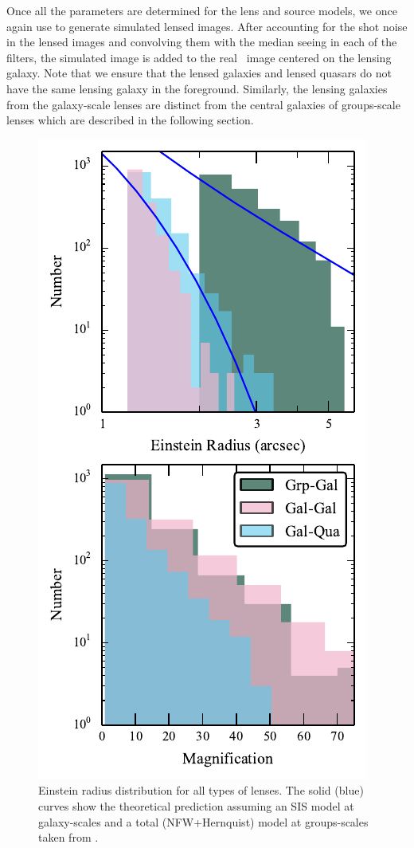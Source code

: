 \documentclass[useAMS,usenatbib,a4paper]{mn2e}
\begin{document}
Once all the parameters are determined for the lens and source models, we once
again use \gravlens to generate simulated lensed images.  After accounting for the shot
noise in the lensed images and convolving them with the median seeing in each of
the filters, the simulated image is added to the real \cfhtls~image centered
on the lensing galaxy. Note that we ensure that the lensed galaxies and
lensed quasars do not have the same lensing galaxy in the foreground. Similarly,
the lensing galaxies from the galaxy-scale lenses are distinct from the central
galaxies of groups-scale lenses which are described in the following section.


\begin{figure}
\begin{center}
\includegraphics[scale=1.2]{distrib_remu.pdf}
\caption{ \label{fig:remudist}
Einstein radius distribution for all types of lenses. The solid (blue)
curves show the theoretical prediction assuming an SIS model at galaxy-scales
and a total (NFW+Hernquist) model at groups-scales taken from \citep{More2012}.
}
\end{center}
\end{figure}
\end{document}

